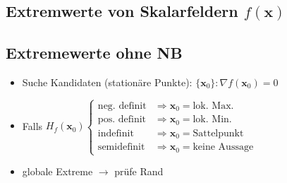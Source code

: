 \documentclass[6pt,a4paper]{scrartcl}
\newcommand{\eset}[1]{\ensuremath{\bigl\{#1\bigr\}}}											%
\renewcommand{\vec}[1]{\ensuremath{\boldsymbol {#1}}}											%
\newcommand{\ra}[0]{\ensuremath{\rightarrow}} 									%
\begin{document}
\begin{multicols*}{4}
\setlength{\tabcolsep}{1em} %


\section{Extremwerte von Skalarfeldern $f(\vec x)$}
\subsection{Extremewerte ohne NB} %
\begin{itemize} \itemsep0pt
	\item Suche Kandidaten (stationäre Punkte): $\eset{\vec x_0}:{\nabla f(\vec x_0) = 0}$
	\item Falls $H_f(\vec x_0) \begin{cases} \text{neg. definit} & \Rightarrow \vec x_0 = \text{lok. Max.} \\ \text{pos. definit} & \Rightarrow \vec x_0 = \text{lok. Min.} \\ \text{indefinit} & \Rightarrow \vec x_0 = \text{Sattelpunkt} \\ \text{semidefinit} & \Rightarrow \vec x_0 = \text{keine Aussage} \end{cases}$\\
	\item globale Extreme $\ra $ prüfe Rand
\end{itemize}


\end{multicols*}
\end{document}
